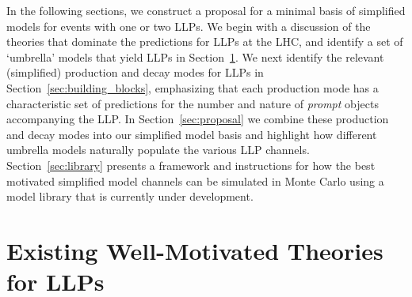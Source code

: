 In the following sections, we construct a proposal for a minimal basis of simplified models for events with one or two LLPs.
We begin with a discussion of the theories that dominate the predictions for LLPs at the LHC, and identify a set of `umbrella' models that yield LLPs in Section~\ref{sec:motivated_theories}.  We next identify the relevant (simplified) production and decay modes for LLPs in Section~\ref{sec:building_blocks},  emphasizing that each production mode has a characteristic set of predictions for the number and nature of {\em prompt} objects accompanying the LLP.  In Section~\ref{sec:proposal} we combine these production and decay modes into our simplified model basis and highlight how different umbrella models naturally populate the various LLP channels.  Section~\ref{sec:library}  presents a framework and instructions for how the best motivated simplified model channels can be simulated in Monte Carlo using a model library that is currently under development. 


\section{Existing Well-Motivated Theories for LLPs}\label{sec:motivated_theories}

